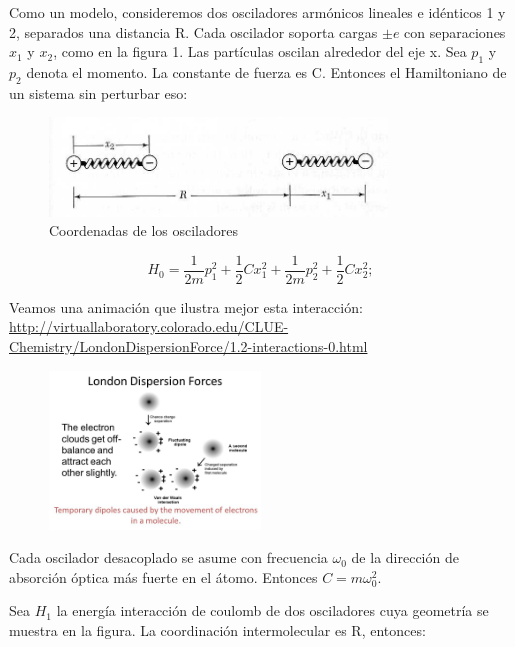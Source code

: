 \documentclass{article}
\begin{document}
Como un modelo, consideremos dos osciladores armónicos lineales e idénticos 1 y 2, separados una distancia R. Cada oscilador soporta cargas $\pm e$ con separaciones $x_{1}$ y $x_{2}$, como en la  figura 1. Las partículas oscilan alrededor del eje x. Sea $p_{1}$ y $p_{2}$ denota el momento. La constante de fuerza es C. Entonces el Hamiltoniano de un sistema sin perturbar eso:


\begin{figure}[h]
    \centering
    \includegraphics[width=0.8\textwidth]{oscilador.png}
    \caption{Coordenadas de los osciladores}
    \label{Figura 1}
\end{figure}

\begin{equation}
    H_{0} = \frac{1}{2m}p_{1}^{2}+\frac{1}{2}Cx_{1}^{2}+\frac{1}{2m}p_{2}^{2}+\frac{1}{2}Cx_{2}^{2};
        \label{eq1}
\end{equation}{}

Veamos una animación que ilustra mejor esta interacción:
\href{url}{http://virtuallaboratory.colorado.edu/CLUE-Chemistry/LondonDispersionForce/1.2-interactions-0.html}

\begin{figure}[h]
    \centering
    \includegraphics[width=0.5\textwidth]{London+Dispersion+Forces.jpg}
    \label{Figura 1}
\end{figure}

Cada oscilador desacoplado se asume con frecuencia $\omega_{0}$ de la dirección de absorción óptica más fuerte en el átomo. Entonces $C= m\omega_{0}^{2}$.

Sea $H_{1}$ la energía interacción de coulomb de dos osciladores cuya geometría se muestra en la figura. La coordinación intermolecular es R, entonces:
\end{document}
